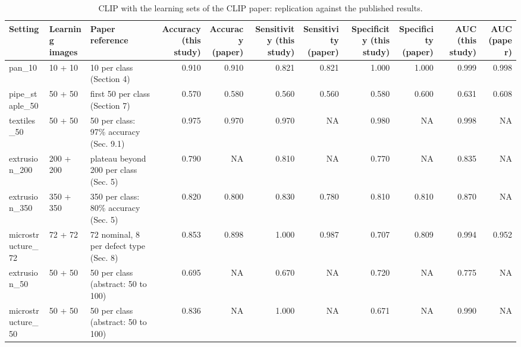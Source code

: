 \begin{table}

\caption{\label{tab:tbl-clip-replication}CLIP with the learning sets of the CLIP paper: replication against the published results.}
\centering
\begin{tabular}[t]{lllrrrrrrrr}
\toprule
Setting & Learning images & Paper reference & Accuracy (this study) & Accuracy (paper) & Sensitivity (this study) & Sensitivity (paper) & Specificity (this study) & Specificity (paper) & AUC (this study) & AUC (paper)\\
\midrule
pan\_10 & 10 + 10 & 10 per class (Section 4) & 0.910 & 0.910 & 0.821 & 0.821 & 1.000 & 1.000 & 0.999 & 0.998\\
pipe\_staple\_50 & 50 + 50 & first 50 per class (Section 7) & 0.570 & 0.580 & 0.560 & 0.560 & 0.580 & 0.600 & 0.631 & 0.608\\
textiles\_50 & 50 + 50 & 50 per class: 97\% accuracy (Sec. 9.1) & 0.975 & 0.970 & 0.970 & NA & 0.980 & NA & 0.998 & NA\\
extrusion\_200 & 200 + 200 & plateau beyond 200 per class (Sec. 5) & 0.790 & NA & 0.810 & NA & 0.770 & NA & 0.835 & NA\\
extrusion\_350 & 350 + 350 & 350 per class: 80\% accuracy (Sec. 5) & 0.820 & 0.800 & 0.830 & 0.780 & 0.810 & 0.810 & 0.870 & NA\\
\addlinespace
microstructure\_72 & 72 + 72 & 72 nominal, 8 per defect type (Sec. 8) & 0.853 & 0.898 & 1.000 & 0.987 & 0.707 & 0.809 & 0.994 & 0.952\\
extrusion\_50 & 50 + 50 & 50 per class (abstract: 50 to 100) & 0.695 & NA & 0.670 & NA & 0.720 & NA & 0.775 & NA\\
microstructure\_50 & 50 + 50 & 50 per class (abstract: 50 to 100) & 0.836 & NA & 1.000 & NA & 0.671 & NA & 0.990 & NA\\
\bottomrule
\end{tabular}
\end{table}
